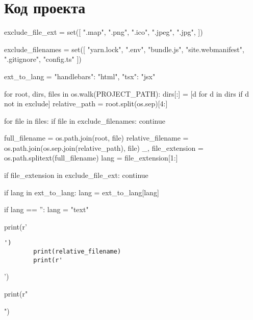 \section{Код проекта}
\begin{pycode}
exclude_file_ext = set([
    ".map",
    ".png",
    ".ico",
    ".jpeg",
    ".jpg",
])

exclude_filenames = set([
    "yarn.lock",
    ".env",
    "bundle.js",
    "site.webmanifest",
    ".gitignore",
    "config.ts"
])

ext_to_lang = {
    "handlebars": "html",
    "tsx": "jsx"
}

for root, dirs, files in os.walk(PROJECT_PATH):
    dirs[:] = [d for d in dirs if d not in exclude]
    relative_path = root.split(os.sep)[4:]

    for file in files:
        if file in exclude_filenames:
                continue

        full_filename = os.path.join(root, file)
        relative_filename = os.path.join(os.sep.join(relative_path), file)
        _, file_extension = os.path.splitext(full_filename)
        lang = file_extension[1:]

        if file_extension in exclude_file_ext:
            continue

        if lang in ext_to_lang:
            lang = ext_to_lang[lang]

        if lang == '':
            lang = "text"

        print(r'\begin{verbatim}')
        print(relative_filename)
        print(r'\end{verbatim}')

        print(r"")
\end{pycode}

\clearpage